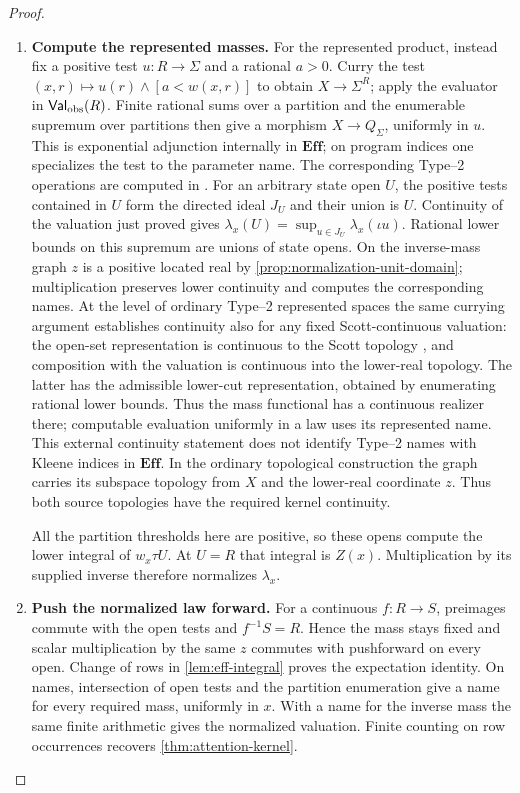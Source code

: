 \documentclass[11pt,a4paper]{article}
\theoremstyle{definition}
\theoremstyle{remark}\newaliascnt{remark}{theorem}
\newcommand{\E}{\mathbf{Eff}}
\numberwithin{equation}{section}
\begin{document}
\begin{proof}
\begin{enumerate}[titledsteps]
    \item \textbf{Compute the represented masses.} For the represented product, instead fix a positive test $u:R\to\Sigma$ and a rational $a>0$. Curry the test $(x,r)\mapsto u(r)\wedge [a<w(x,r)]$ to obtain $X\to\Sigma^R$; apply the evaluator in $\mathsf{Val}_{\rm obs}(R)$. Finite rational sums over a partition and the enumerable supremum over partitions then give a morphism $X\to Q_\Sigma$, uniformly in $u$. This is exponential adjunction internally in $\E$; on program indices one specializes the test to the parameter name. The corresponding Type--2 operations are computed in \cite[Proposition~3]{pauly-represented}. For an arbitrary state open $U$, the positive tests contained in $U$ form the directed ideal $J_U$ and their union is $U$. Continuity of the valuation just proved gives $\lambda_x(U)=\sup_{u\in J_U}\lambda_x(\iota u)$. Rational lower bounds on this supremum are unions of state opens. On the inverse-mass graph $z$ is a positive located real by \cref{prop:normalization-unit-domain}; multiplication preserves lower continuity and computes the corresponding names. At the level of ordinary Type--2 represented spaces the same currying argument establishes continuity also for any fixed Scott-continuous valuation: the open-set representation is continuous to the Scott topology \cite[\S2]{hoyrup-represented}, and composition with the valuation is continuous into the lower-real topology. The latter has the admissible lower-cut representation, obtained by enumerating rational lower bounds. Thus the mass functional has a continuous realizer there; computable evaluation uniformly in a law uses its represented name. This external continuity statement does not identify Type--2 names with Kleene indices in $\E$. In the ordinary topological construction the graph carries its subspace topology from $X$ and the lower-real coordinate $z$. Thus both source topologies have the required kernel continuity.

All the partition thresholds here are positive, so these opens compute the lower integral of $w_x\tau U$. At $U=R$ that integral is $Z(x)$. Multiplication by its supplied inverse therefore normalizes $\lambda_x$.


    \item \textbf{Push the normalized law forward.} For a continuous \(f:R\to S\), preimages commute with the open tests and \(f^{-1}S=R\). Hence the mass stays fixed and scalar multiplication by the same \(z\) commutes with pushforward on every open. Change of rows in \cref{lem:eff-integral} proves the expectation identity. On names, intersection of open tests and the partition enumeration give a name for every required mass, uniformly in \(x\). With a name for the inverse mass the same finite arithmetic gives the normalized valuation. Finite counting on row occurrences recovers \cref{thm:attention-kernel}.\qedhere
\end{enumerate}
\end{proof}
\end{document}
